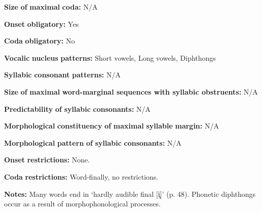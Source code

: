 \documentclass[output=paper]{langsci/langscibook}
\begin{document}
\begin{styleBody}
\textbf{Size} \textbf{of} \textbf{maximal} \textbf{coda:} N/A
\end{styleBody}

\begin{styleBody}
\textbf{Onset} \textbf{obligatory:} Yes
\end{styleBody}

\begin{styleBody}
\textbf{Coda} \textbf{obligatory:} No
\end{styleBody}

\begin{styleBody}
\textbf{Vocalic} \textbf{nucleus} \textbf{patterns:} Short vowels, Long vowels, Diphthongs
\end{styleBody}

\begin{styleBody}
\textbf{Syllabic} \textbf{consonant} \textbf{patterns:} N/A
\end{styleBody}

\begin{styleBody}
\textbf{Size} \textbf{of} \textbf{maximal} \textbf{word{}-marginal sequences with syllabic obstruents:} N/A
\end{styleBody}

\begin{styleBody}
\textbf{Predictability} \textbf{of} \textbf{syllabic} \textbf{consonants:} N/A
\end{styleBody}

\begin{styleBody}
\textbf{Morphological} \textbf{constituency} \textbf{of} \textbf{maximal} \textbf{syllable} \textbf{margin:} N/A
\end{styleBody}

\begin{styleBody}
\textbf{Morphological} \textbf{pattern} \textbf{of} \textbf{syllabic} \textbf{consonants:} N/A
\end{styleBody}

\begin{styleBody}
\textbf{Onset} \textbf{restrictions:} None.
\end{styleBody}

\begin{styleBody}
\textbf{Coda} \textbf{restrictions:} Word-finally, no restrictions.
\end{styleBody}

\begin{styleBody}
\textbf{Notes:} Many words end in ‘hardly audible final [i̥]’ (p. 48). Phonetic diphthongs occur as a result of morphophonological processes.
\end{styleBody}
\end{document}
